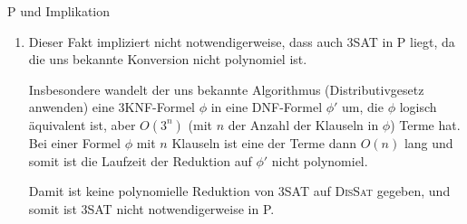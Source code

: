 \documentclass[answers]{submit}
\begin{document}
\begin{exercise}[6]{P und Implikation}
{\begin{enumerate}
            Die Laufzeit von $M$ ist polynomiel, da für jede Formel $\phi$ in DNF nur die Konjunktionsterme in $\phi$ betrachtet werden müssen.

            Die Betrachtung der Konjunktionsterme ist polynomiel, da für jeden Konjunktionsterm $K_i$ nur die Literale in $K_i$ betrachtet werden müssen,
            und naiverweise nur jedes Paar von Literalen in $K_i$ betrachtet werden muss (quadratische Vergleiche).

            Wenn $M$ die Formel $\phi$ in DNF akzeptiert, dann ist $\phi$ erfüllbar, mit einer Interpretation $I$ die alle Literale des $K_i$ erfüllt,
            in dem $M$ akzeptiert.

            Wenn $M$ nicht akzeptiert, dann ist entweder:
            \begin{enumerate}
              \item Die Eingabe $w$ nicht von der Form $\langle \phi \rangle$ für eine Formel $\phi$ in DNF.
              \item $\phi$ nicht erfüllbar, da alle Konjunktionsterme wiederspruchsvoll sind.
            \end{enumerate}

            $\Rightarrow$ \textsc{DisSat} ist in P.

      \item Dieser Fakt impliziert nicht notwendigerweise, dass auch \textsc{3SAT} in P liegt, da die uns bekannte Konversion
            nicht polynomiel ist.

            Insbesondere wandelt der uns bekannte Algorithmus (Distributivgesetz anwenden) eine 3KNF-Formel $\phi$ in eine DNF-Formel $\phi'$ um,
            die $\phi$ logisch äquivalent ist, aber $O(3^n)$ (mit $n$ der Anzahl der Klauseln in $\phi$) Terme hat. Bei einer Formel $\phi$ mit $n$ Klauseln
            ist eine der Terme dann $O(n)$ lang und somit ist die Laufzeit der Reduktion auf $\phi'$ nicht polynomiel.

            Damit ist keine polynomielle Reduktion von \textsc{3SAT} auf \textsc{DisSat} gegeben, und somit ist \textsc{3SAT} nicht notwendigerweise in P.
    \end{enumerate}
  }
\end{exercise}
\end{document}
